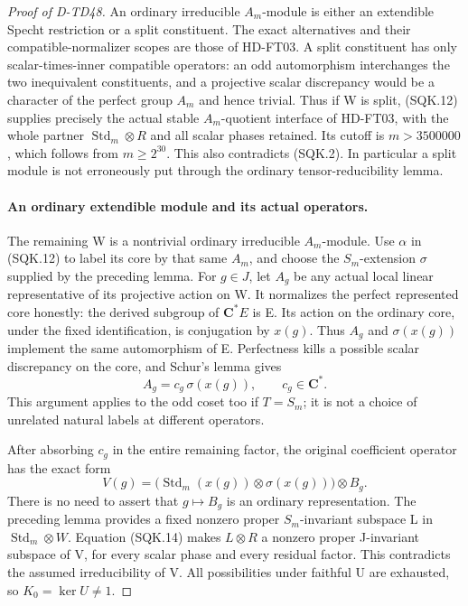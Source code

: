 \begin{proof}[Proof of D-TD48]
An ordinary irreducible \(A_m\)-module is either an
extendible Specht restriction or a split constituent.
The exact alternatives and their compatible-normalizer
scopes are those of HD-FT03.  A split constituent has
only scalar-times-inner compatible operators: an odd
automorphism interchanges the two inequivalent constituents,
and a projective scalar discrepancy would be a character
of the perfect group \(A_m\) and hence trivial.  Thus if W
is split, (SQK.12) supplies precisely the actual stable
\(A_m\)-quotient interface of HD-FT03, with the whole
partner \(\operatorname{Std}_m\otimes R\) and all scalar
phases retained.  Its cutoff is \(m>3500000\), which
follows from \(m\ge2^{30}\).  This also contradicts
(SQK.2).  In particular a split module is not erroneously
put through the ordinary tensor-reducibility lemma.

\paragraph{An ordinary extendible module and its actual operators.}
The remaining W is a nontrivial ordinary irreducible
\(A_m\)-module.  Use \(\alpha\) in (SQK.12) to label its
core by that same \(A_m\), and choose the \(S_m\)-extension
\(\sigma\) supplied by the preceding lemma.
For \(g\in J\), let \(A_g\) be any actual local linear
representative of its projective action on W.
It normalizes the perfect represented core honestly:
the derived subgroup of \(\mathbf C^*E\) is E.
Its action on the ordinary core, under the fixed
identification, is conjugation by \(x(g)\).
Thus \(A_g\) and \(\sigma(x(g))\) implement the same
automorphism of E.  Perfectness kills a possible scalar
discrepancy on the core, and Schur's lemma gives
\[
                         A_g=c_g\,\sigma(x(g)),
                         \qquad c_g\in\mathbf C^* .
 \tag{SQK.13}
\]
This argument applies to the odd coset too if \(T=S_m\);
it is not a choice of unrelated natural labels at
different operators.

After absorbing \(c_g\) in the entire remaining factor,
the original coefficient operator has the exact form
\[
 V(g)=
  \bigl(\operatorname{Std}_m(x(g))\otimes\sigma(x(g))\bigr)
                         \otimes B_g .
 \tag{SQK.14}
\]
There is no need to assert that \(g\mapsto B_g\) is an
ordinary representation.  The preceding lemma provides
a fixed nonzero proper \(S_m\)-invariant subspace L in
\(\operatorname{Std}_m\otimes W\).
Equation (SQK.14) makes \(L\otimes R\) a nonzero proper
J-invariant subspace of V, for every scalar phase and
every residual factor.  This contradicts the assumed
irreducibility of V.  All possibilities under faithful U
are exhausted, so \(K_0=\ker U\ne1\).


\end{proof}
